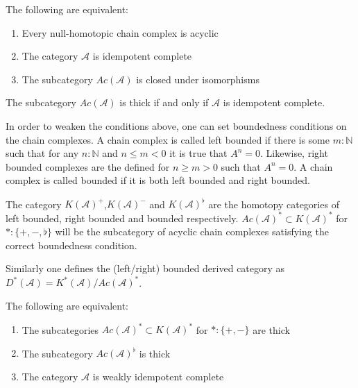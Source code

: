     \begin{lemma}
        The following are equivalent:
        \begin{enumerate}
            \item Every null-homotopic chain complex is acyclic
            \item The category $\mathcal{A}$ is idempotent complete
            \item The subcategory $Ac(\mathcal{A})$ is closed under isomorphisms
        \end{enumerate}
    \end{lemma}

    \begin{corollary}
        The subcategory $Ac(\mathcal{A})$ is thick if and only if $\mathcal{A}$ is idempotent complete.
    \end{corollary}

    In order to weaken the conditions above, one can set boundedness conditions on the chain complexes. A chain complex is called left bounded if there is some $m:\mathbb{N}$ such that for any $n:\mathbb{N}$ and $n\leq m<0$ it is true that $A^n = 0$. Likewise, right bounded complexes are the defined for $n\geq m>0$ such that $A^n=0$. A chain complex is called bounded if it is both left bounded and right bounded.

    \begin{definition}
        The category $K(\mathcal{A})^+$,$K(\mathcal{A})^-$ and $K(\mathcal{A})^{\flat}$ are the homotopy categories of left bounded, right bounded and bounded respectively. $Ac(\mathcal{A})^* \subset K(\mathcal{A})^*$ for $*:\{+,-,\flat\}$ will be the subcategory of acyclic chain complexes satisfying the correct boundedness condition.
        
        Similarly one defines the (left/right) bounded derived category as $D^*(\mathcal{A}) = K^*(\mathcal{A})/Ac(\mathcal{A})^*$.
    \end{definition}
        
    \begin{lemma}
        The following are equivalent:
        \begin{enumerate}
            \item The subcategories $Ac(\mathcal{A})^* \subset K(\mathcal{A})^*$ for $*:\{+,-\}$ are thick
            \item The subcategory $Ac(\mathcal{A})^{\flat}$ is thick
            \item The category $\mathcal{A}$ is weakly idempotent complete
        \end{enumerate}
    \end{lemma}

